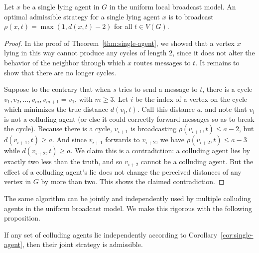 \documentclass{comnet}
\begin{document}
\begin{corollary} \label{cor:single-agent}

Let $x$ be a single lying agent in $G$ in the uniform local broadcast model. An
optimal admissible strategy for a single lying agent $x$ is to broadcast
$\rho(x,t) = \max(1, d(x,t) - 2)$ for all $t \in V(G)$.  

\end{corollary}

\begin{proof}
In the proof of Theorem~\ref{thm:single-agent}, we showed that a vertex $x$
lying in this way cannot produce any cycles of length 2, since it does not
alter the behavior of the neighbor through which $x$ routes messages to $t$. It
remains to show that there are no longer cycles.

Suppose to the contrary that when $s$ tries to send a message to $t$, there is
a cycle $v_1, v_2, \dots, v_m, v_{m+1} = v_1$, with $m \geq 3$. Let $i$ be the
index of a vertex on the cycle which minimizes the true distance $d(v_i, t)$.
Call this distance $a$, and note that $v_i$ is not a colluding agent (or else
it could correctly forward messages so as to break the cycle). Because there is
a cycle, $v_{i+1}$ is broadcasting $\rho(v_{i+1}, t) \leq a-2$, but $d(v_{i+1},
t) \geq a$. And since $v_{i+1}$ forwards to $v_{i+2}$, we have $\rho(v_{i+2},
t) \leq a-3$ while $d(v_{i+2}, t) \geq a$. We claim this is a contradiction: a
colluding agent lies by exactly two less than the truth, and so $v_{i+2}$
cannot be a colluding agent. But the effect of a colluding agent's lie does not
change the perceived distances of any vertex in $G$ by more than two. This
shows the claimed contradiction.
\end{proof}

The same algorithm can be jointly and independently used by multiple colluding
agents in the uniform broadcast model. We make this rigorous with the following
proposition.

\begin{proposition} \label{prop:independent-agents}

If any set of colluding agents lie independently according to
Corollary~\ref{cor:single-agent}, then their joint strategy is admissible.

\end{proposition}
\end{document}
